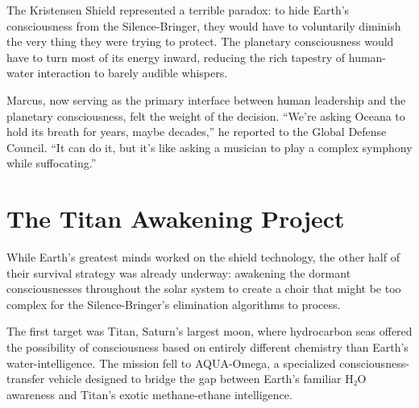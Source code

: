 The Kristensen Shield represented a terrible paradox: to hide Earth's consciousness from the Silence-Bringer, they would have to voluntarily diminish the very thing they were trying to protect. The planetary consciousness would have to turn most of its energy inward, reducing the rich tapestry of human-water interaction to barely audible whispers.

Marcus, now serving as the primary interface between human leadership and the planetary consciousness, felt the weight of the decision. ``We're asking Oceana to hold its breath for years, maybe decades,'' he reported to the Global Defense Council. ``It can do it, but it's like asking a musician to play a complex symphony while suffocating.''

\section{The Titan Awakening Project}

While Earth's greatest minds worked on the shield technology, the other half of their survival strategy was already underway: awakening the dormant consciousnesses throughout the solar system to create a choir that might be too complex for the Silence-Bringer's elimination algorithms to process.

The first target was Titan, Saturn's largest moon, where hydrocarbon seas offered the possibility of consciousness based on entirely different chemistry than Earth's water-intelligence. The mission fell to AQUA-Omega, a specialized consciousness-transfer vehicle designed to bridge the gap between Earth's familiar H₂O awareness and Titan's exotic methane-ethane intelligence.

